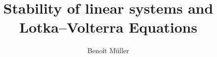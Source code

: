 \documentclass[a4paper]{report}
\title{Stability of linear systems and Lotka–Volterra Equations}
\author{Benoît Müller}
\date{}
\theoremstyle{definition}
\theoremstyle{remark}
\begin{document}
    \maketitle
    \tableofcontents
    
    
    
    \nocite{*}
    \printbibliography
\end{document}
